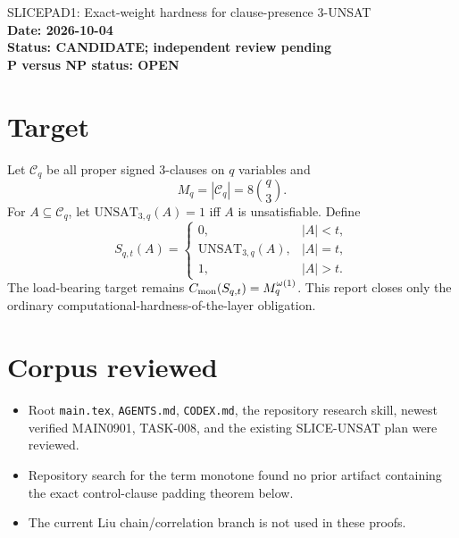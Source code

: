 \documentclass[11pt]{article}
\begin{document}
\begin{center}
{\Large SLICEPAD1: Exact-weight hardness for clause-presence 3-UNSAT}\\[4pt]
\textbf{Date: 2026-10-04}\\
\textbf{Status: CANDIDATE; independent review pending}\\
\textbf{P versus NP status: OPEN}
\end{center}

\section{Target}
Let \(\mathcal C_q\) be all proper signed 3-clauses on \(q\) variables and
\[
M_q=|\mathcal C_q|=8\binom q3.
\]
For \(A\subseteq\mathcal C_q\), let \(\mathrm{UNSAT}_{3,q}(A)=1\) iff \(A\) is unsatisfiable. Define
\[
S_{q,t}(A)=
\begin{cases}
0,&|A|<t,\\
\mathrm{UNSAT}_{3,q}(A),&|A|=t,\\
1,&|A|>t.
\end{cases}
\]
The load-bearing target remains \(C_{\rm mon}(S_{q,t})=M_q^{\omega(1)}\). This report closes only the ordinary computational-hardness-of-the-layer obligation.

\section{Corpus reviewed}
\begin{itemize}
\item[] Root \texttt{main.tex}, \texttt{AGENTS.md}, \texttt{CODEX.md}, the repository research skill, newest verified MAIN0901, TASK-008, and the existing SLICE-UNSAT plan were reviewed.
\item[] Repository search for the term monotone found no prior artifact containing the exact control-clause padding theorem below.
\item[] The current Liu chain/correlation branch is not used in these proofs.
\end{itemize}
\end{document}
